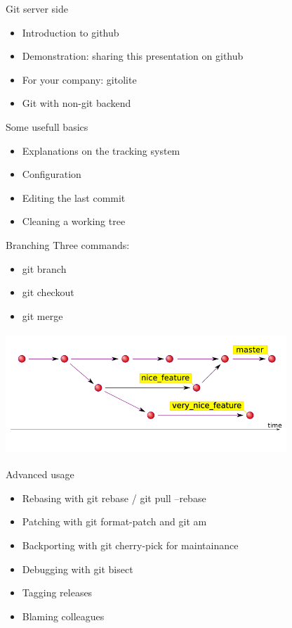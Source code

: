 \documentclass{beamer}
\begin{document}
\begin{frame}{Git server side}
    \begin{itemize}
        \item Introduction to github
        \pause
        \item Demonstration: sharing this presentation on github
        \pause
        \item For your company: gitolite
        \pause
        \item Git with non-git backend
    \end{itemize}
\end{frame}

\begin{frame}{Some usefull basics}
    \begin{itemize}
        \item Explanations on the tracking system
        \pause
        \item Configuration
        \pause
        \item Editing the last commit
        \pause
        \item Cleaning a working tree
    \end{itemize}
\end{frame}

\begin{frame}{Branching}
    Three commands: \\
    \begin{itemize}
        \item git branch
        \item git checkout
        \item git merge
    \end{itemize}
    \includegraphics[width=300pt,height=130pt]{branches.png}
\end{frame}

\begin{frame}{Advanced usage}
    \begin{itemize}
        \item Rebasing with git rebase / git pull --rebase
        \pause
        \item Patching with git format-patch and git am
        \pause
        \item Backporting with git cherry-pick for maintainance
        \pause
        \item Debugging with git bisect
        \pause
        \item Tagging releases
        \pause
        \item Blaming colleagues
    \end{itemize}
\end{frame}
\end{document}
